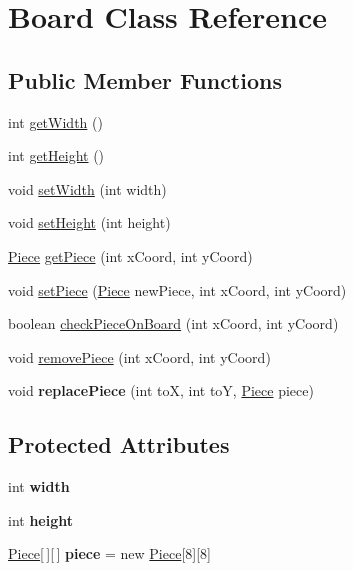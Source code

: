 \hypertarget{class_board}{}\section{Board Class Reference}
\label{class_board}
\subsection*{Public Member Functions}
\begin{DoxyCompactItemize}
\item 
int \hyperlink{class_board_a514e9e5c80174d567fe5f1311b105a24}{get\+Width} ()
\item 
int \hyperlink{class_board_a89073052a738d3960b573a695e1aafed}{get\+Height} ()
\item 
void \hyperlink{class_board_a7860357debff0df2cad62b14305e7a99}{set\+Width} (int width)
\item 
void \hyperlink{class_board_a4690b660f6edd459c4f02f77dc551478}{set\+Height} (int height)
\item 
\hyperlink{class_piece}{Piece} \hyperlink{class_board_ad4228992ab9ea75d6e36546047971ace}{get\+Piece} (int x\+Coord, int y\+Coord)
\item 
void \hyperlink{class_board_a71ea4447e55dc3b152d5b5d3ea47fc9a}{set\+Piece} (\hyperlink{class_piece}{Piece} new\+Piece, int x\+Coord, int y\+Coord)
\item 
boolean \hyperlink{class_board_a4b0170c56fbe6bc4cea24d53c9666c5f}{check\+Piece\+On\+Board} (int x\+Coord, int y\+Coord)
\item 
void \hyperlink{class_board_abd1044868608621ab830d8e2dfaaf799}{remove\+Piece} (int x\+Coord, int y\+Coord)
\item 
\hypertarget{class_board_aea5a90bdae0d9b4c25441cc08bc2ac64}{}void {\bfseries replace\+Piece} (int to\+X, int to\+Y, \hyperlink{class_piece}{Piece} piece)\label{class_board_aea5a90bdae0d9b4c25441cc08bc2ac64}

\end{DoxyCompactItemize}
\subsection*{Protected Attributes}
\begin{DoxyCompactItemize}
\item 
\hypertarget{class_board_a2f9e52c8f83e21be433bb3a323834595}{}int {\bfseries width}\label{class_board_a2f9e52c8f83e21be433bb3a323834595}

\item 
\hypertarget{class_board_adbbf79735f96938460ee9bd4056ced62}{}int {\bfseries height}\label{class_board_adbbf79735f96938460ee9bd4056ced62}

\item 
\hypertarget{class_board_aa29961b0c52a6744018ff6060bd3c116}{}\hyperlink{class_piece}{Piece}\mbox{[}$\,$\mbox{]}\mbox{[}$\,$\mbox{]} {\bfseries piece} = new \hyperlink{class_piece}{Piece}\mbox{[}8\mbox{]}\mbox{[}8\mbox{]}\label{class_board_aa29961b0c52a6744018ff6060bd3c116}

\end{DoxyCompactItemize}


